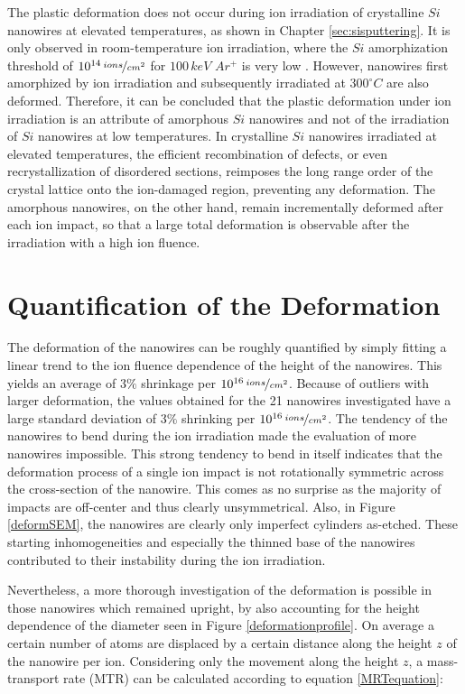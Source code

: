 The plastic deformation does not occur during ion irradiation of crystalline $Si$ nanowires at elevated temperatures, as shown in Chapter \ref{sec:sisputtering}. It is only observed in room-temperature ion irradiation, where the $Si$ amorphization threshold of $10^{14}\,\nicefrac{ions}{cm^2}$ for $100\,keV\,\,Ar^+$ is very low \cite{pelaz_ion-beam-induced_2004}. However, nanowires first amorphized by ion irradiation and subsequently irradiated at $300^\circ C$ are also deformed. Therefore, it can be concluded that the plastic deformation under ion irradiation is an attribute of amorphous $Si$ nanowires and not of the irradiation of $Si$ nanowires at low temperatures. In crystalline $Si$ nanowires irradiated at elevated temperatures, the efficient recombination of defects, or even recrystallization of disordered sections, reimposes the long range order of the crystal lattice onto the ion-damaged region, preventing any deformation. The amorphous nanowires, on the other hand, remain incrementally deformed after each ion impact, so that a large total deformation is observable after the irradiation with a high ion fluence.


\section{Quantification of the Deformation}
\label{sec:quantifydeformation}

The deformation of the nanowires can be roughly quantified by simply fitting a linear trend to the ion fluence dependence of the height of the nanowires. This yields an average of $3\%$ shrinkage per $10^{16}\,\nicefrac{ions}{cm^2}$. Because of outliers with larger deformation, the values obtained for the 21 nanowires investigated have a large standard deviation of $3\%$ shrinking per $10^{16}\,\nicefrac{ions}{cm^2}$. The tendency of the nanowires to bend during the ion irradiation made the evaluation of more nanowires impossible. This strong tendency to bend in itself indicates that the deformation process of a single ion impact is not rotationally symmetric across the cross-section of the nanowire. This comes as no surprise as the majority of impacts are off-center and thus clearly unsymmetrical. Also, in Figure \ref{deformSEM}, the nanowires are clearly only imperfect cylinders as-etched. These starting inhomogeneities and especially the thinned base of the nanowires contributed to their instability during the ion irradiation.

Nevertheless, a more thorough investigation of the deformation is possible in those nanowires which remained upright, by also accounting for the height dependence of the diameter seen in Figure \ref{deformationprofile}. On average a certain number of atoms are displaced by a certain distance along the height $z$ of the nanowire per ion. Considering only the movement along the height $z$, a mass-transport rate (MTR) can be calculated according to equation \ref{MRTequation}:


